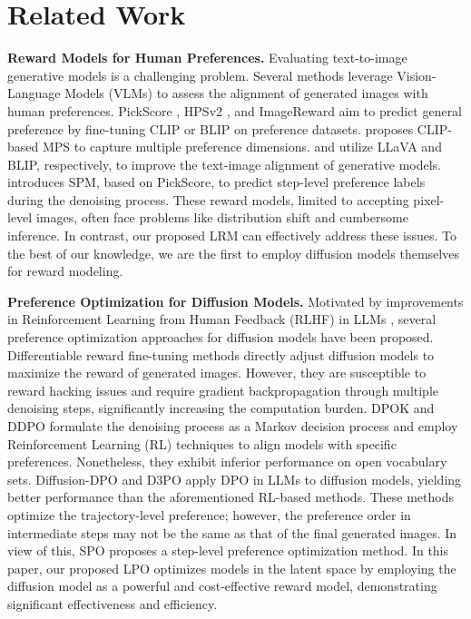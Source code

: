 \section{Related Work}
\label{sec:related_work}

\textbf{Reward Models for Human Preferences.} Evaluating text-to-image generative models is a challenging problem. Several methods leverage Vision-Language Models (VLMs) to assess the alignment of generated images with human preferences. PickScore \cite{pickscore}, HPSv2 \cite{hpsv2}, and ImageReward \cite{imagereward} aim to predict general preference by fine-tuning CLIP \cite{clip} or BLIP \cite{blip} on preference datasets. \citet{mps} proposes CLIP-based MPS to capture multiple preference dimensions. \citet{ddpo} and \citet{comat} utilize LLaVA \cite{llava} and BLIP, respectively, to improve the text-image alignment of generative models. \citet{spo} introduces SPM, based on PickScore, to predict step-level preference labels during the denoising process. 
These reward models, limited to accepting pixel-level images, often face problems like distribution shift and cumbersome inference. In contrast, our proposed LRM can effectively address these issues. To the best of our knowledge, we are the first to employ diffusion models themselves for reward modeling.

\textbf{Preference Optimization for Diffusion Models.} Motivated by improvements in Reinforcement Learning from Human Feedback (RLHF) in LLMs \cite{llama2, llama3}, several preference optimization approaches for diffusion models have been proposed. Differentiable reward fine-tuning methods \cite{draft,drtune} directly adjust diffusion models to maximize the reward of generated images. However, they are susceptible to reward hacking issues and require gradient backpropagation through multiple denoising steps, significantly increasing the computation burden. DPOK \cite{dpok} and DDPO \cite{ddpo} formulate the denoising process as a Markov decision process and employ Reinforcement Learning (RL) techniques to align models with specific preferences. Nonetheless, they exhibit inferior performance on open vocabulary sets. Diffusion-DPO \cite{diffusion_dpo} and D3PO \cite{d3po} apply DPO \cite{dpo} in LLMs to diffusion models, yielding better performance than the aforementioned RL-based methods. These methods optimize the trajectory-level preference; however, the preference order in intermediate steps may not be the same as that of the final generated images. In view of this, SPO \cite{spo} proposes a step-level preference optimization method. In this paper, our proposed LPO optimizes models in the latent space by employing the diffusion model as a powerful and cost-effective reward model, demonstrating significant effectiveness and efficiency.
